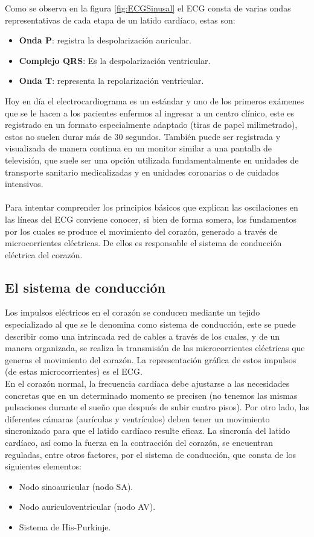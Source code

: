 \documentclass[12pt,letterpaper,oneside,openright]{book}
\begin{document}
    Como se observa en la figura \ref{fig:ECGSinusal} el ECG consta de varias ondas representativas de cada etapa de un latido cardíaco, estas son: \\	
	\begin{itemize}
		\item \textbf{Onda P}: registra la despolarización auricular.
		\item \textbf{Complejo QRS}: Es la despolarización ventricular.
		\item \textbf{Onda T}: representa la repolarización ventricular.
	\end{itemize}
	
	Hoy en día el electrocardiograma es un estándar y uno de los primeros exámenes que se le hacen a los pacientes enfermos al ingresar a un centro clínico, este es registrado en un formato especialmente adaptado (tiras de papel milimetrado), estos no suelen durar más de 30 segundos. También puede ser registrada y visualizada de manera continua en un monitor similar a una pantalla de televisión, que suele ser una opción utilizada fundamentalmente en unidades de transporte sanitario medicalizadas y en unidades coronarias o de cuidados intensivos. \\
	\\
	Para intentar comprender los principios básicos que explican las oscilaciones en las líneas del ECG conviene conocer, si bien de forma somera, los fundamentos por los cuales se produce el movimiento del corazón, generado a través de microcorrientes eléctricas. De ellos es responsable el sistema de conducción eléctrica del corazón.
	
	\subsection{El sistema de conducción}
	Los impulsos eléctricos en el corazón se conducen mediante un tejido especializado al que se le denomina como sistema de conducción, este se puede describir como una intrincada red de cables a través de los cuales, y de un manera organizada, se realiza la transmisión de las microcorrientes eléctricas que generas el movimiento del corazón. La representación gráfica de estos impulsos (de estas microcorrientes) es el ECG. \\
	En el corazón normal, la frecuencia cardíaca debe ajustarse a las necesidades concretas que en un determinado momento se precisen (no tenemos las mismas pulsaciones durante el sueño que después de subir cuatro pisos). Por otro lado, las diferentes cámaras (aurículas y ventrículos) deben tener un movimiento sincronizado para que el latido cardíaco resulte eficaz. La sincronía del latido cardíaco, así como la fuerza en la contracción del corazón, se encuentran reguladas, entre otros factores, por el sistema de conducción, que consta de los siguientes elementos: 
	\begin{itemize}
		\item Nodo sinoauricular (nodo SA).
		\item Nodo auriculoventricular (nodo AV).
		\item Sistema de His-Purkinje.
	\end{itemize}
	
\end{document}
